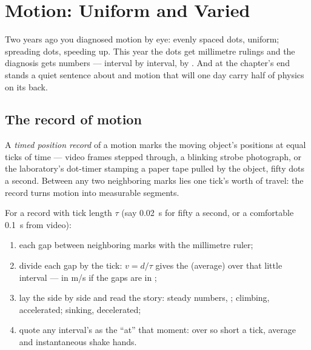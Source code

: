 \chapter{Motion: Uniform and Varied}\label{ch:g9:uniform-varied-motion}

Two years ago you diagnosed motion by eye: evenly spaced dots,
uniform; spreading dots, speeding up. This year the dots get
millimetre rulings and the diagnosis gets numbers --- interval
by interval,  by . And at the chapter's end stands a
quiet sentence about  and motion that will one day carry
half of physics on its back.

\section{The record of motion}

\begin{definition}\label{def:g9:uniform-varied-motion:record}
A \emph{timed position record} of
a motion marks the moving object's positions at equal ticks of
time --- video frames stepped through, a blinking strobe
photograph, or the laboratory's dot-timer stamping a paper
tape pulled by the object, fifty dots a second. Between any
two neighboring marks lies one tick's worth of travel: the
record turns motion into measurable segments.
\end{definition}

\begin{method}\label{met:g9:uniform-varied-motion:read}
For a record with tick length $\tau$ (say \qty{0.02}{s} for
fifty a second, or a comfortable \qty{0.1}{s} from video):
\begin{enumerate}
  \item {} each gap between neighboring marks with the
        millimetre ruler;
  \item divide each gap by the tick: $v = d/\tau$ gives the
        (average)  over that little interval --- in
        \unit{m/s} if the gaps are in ;
  \item lay the  side by side and read the story:
        steady numbers, ; climbing, accelerated;
        sinking, decelerated;
  \item quote any interval's  as the  ``at'' that
        moment: over so short a tick, average and
        instantaneous shake hands.
\end{enumerate}
\end{method}

